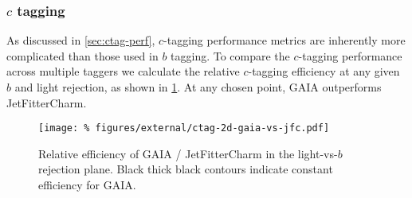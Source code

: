 \subsubsection{$c$ tagging}

As discussed in \cref{sec:ctag-perf}, $c$-tagging performance metrics are inherently more complicated than those used in $b$ tagging.
To compare the $c$-tagging performance across multiple taggers we calculate the relative $c$-tagging efficiency at any given $b$ and light rejection, as shown in \cref{fig:ctag-gaia-vs-jfc}.
At any chosen point, GAIA outperforms JetFitterCharm.

\begin{figure}
  \begin{center}
  \texttt{[image: \%
    figures/external/ctag-2d-gaia-vs-jfc.pdf]}
  \caption[Charm jet efficiency comparison in duel-rejection plane]{%
    Relative efficiency of GAIA / JetFitterCharm in the light-vs-$b$ rejection plane. Black thick black contours indicate constant efficiency for GAIA.}
  \label{fig:ctag-gaia-vs-jfc}
  \end{center}
\end{figure}

